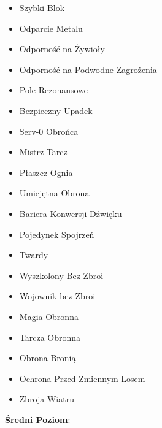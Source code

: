 \begin{itemize}
\item Szybki Blok
\item Odparcie Metalu
\item Odporność na Żywioły
\item Odporność na Podwodne Zagrożenia
\item Pole Rezonansowe
\item Bezpieczny Upadek
\item Serv-0 Obrońca
\item Mistrz Tarcz
\item Płaszcz Ognia
\item Umiejętna Obrona
\item Bariera Konwersji Dźwięku
\item Pojedynek Spojrzeń
\item Twardy
\item Wyszkolony Bez Zbroi
\item Wojownik bez Zbroi
\item Magia Obronna
\item Tarcza Obronna
\item Obrona Bronią
\item Ochrona Przed Zmiennym Losem
\item Zbroja Wiatru
\end{itemize}

\textbf{Średni Poziom}:

